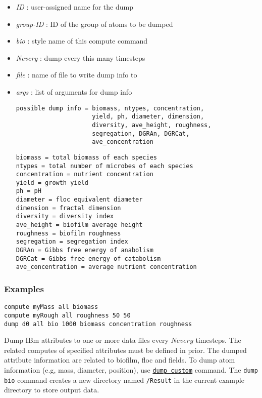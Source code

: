 \documentclass[11pt,a4paper,openright]{article}
\begin{document}
\begin{itemize}  [nosep]
\item
	{\it ID }: user-assigned name for the dump
\item
	{\it group-ID }: ID of the group of atoms to be dumped
\item
	{\it bio }: style name of this compute command
\item
	{\it Nevery }: dump every this many timesteps
\item
	{\it file }: name of file to write dump info to
\item
	{\it args }:  list of arguments for dump info
\begin{Verbatim}[frame=single]
possible dump info = biomass, ntypes, concentration, 
                     yield, ph, diameter, dimension,
                     diversity, ave_height, roughness, 
                     segregation, DGRAn, DGRCat,
                     ave_concentration
\end{Verbatim}
\begin{Verbatim}[frame=single]
biomass = total biomass of each species
ntypes = total number of microbes of each species 
concentration = nutrient concentration
yield = growth yield 
ph = pH
diameter = floc equivalent diameter
dimension = fractal dimension
diversity = diversity index
ave_height = biofilm average height
roughness = biofilm roughness
segregation = segregation index
DGRAn = Gibbs free energy of anabolism
DGRCat = Gibbs free energy of catabolism
ave_concentration = average nutrient concentration 
\end{Verbatim}

\end{itemize}

\subsubsection*{Examples}

\begin{Verbatim}[frame=single]
compute myMass all biomass
compute myRough all roughness 50 50
dump d0 all bio 1000 biomass concentration roughness
\end{Verbatim}

Dump IBm attributes to one or more data files every $Nevery$ timesteps. 
The related computes of specified attributes must be defined in prior.
The dumped attribute information are related to biofilm, floc and fields. 
To dump atom information (e.g, mass, diameter, position), use 
\href{http://lammps.sandia.gov/doc/dump.html}{\tt dump custom} command.
The {\tt dump bio} command creates a new directory named {\tt /Result} in the current example directory to store output data. 
\end{document}
